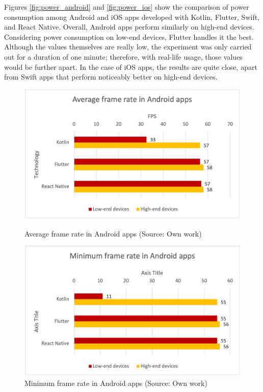 Figures \ref{fig:power_android} and \ref{fig:power_ios} show the comparison of power consumption among Android and iOS apps developed with Kotlin, Flutter, Swift, and React Native. Overall, Android apps perform similarly on high-end devices. Considering power consumption on low-end devices, Flutter handles it the best. Although the values themselves are really low, the experiment was only carried out for a duration of one minute; therefore, with real-life usage, those values would be further apart. In the case of iOS apps, the results are quite close, apart from Swift apps that perform noticeably better on high-end devices.

\begin{figure}[H]
    \begin{minipage}{.48\textwidth}
        \includegraphics[width=\textwidth]{img/fps_average_android}
        \caption{Average frame rate in Android apps (Source: Own work)}
        \label{fig:fps_avg_android}
    \end{minipage}
    \hfill
    \begin{minipage}{.48\textwidth}
        \includegraphics[width=\textwidth]{img/fps_min_android}
        \caption{Minimum frame rate in Android apps (Source: Own work)}
        \label{fig:fps_min_android}
    \end{minipage}
\end{figure}

